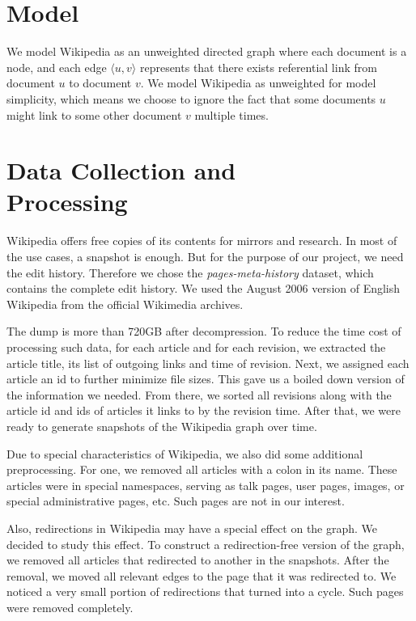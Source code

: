 \documentclass[10pt]{article}
\begin{document}
\begin{multicols}{2}
\section{Model}
We model Wikipedia as an unweighted directed graph where each document is a node, and each edge $\langle u, v \rangle$ represents that there exists referential link from document $u$ to document $v$. We model Wikipedia as unweighted for model simplicity, which means we choose to ignore the fact that some documents $u$ might link to some other document $v$ multiple times.


\section{Data Collection and\\ Processing}
Wikipedia offers free copies of its contents for mirrors and research. In most of the use cases, a snapshot is enough. But for the purpose of our project, we need the edit history. Therefore we chose the {\it pages-meta-history} dataset, which contains the complete edit history. We used the August 2006 version of English Wikipedia from the official Wikimedia archives.

The dump is more than 720GB after decompression. To reduce the time cost of processing such data, for each article and for each revision, we extracted the article title, its list of outgoing links and time of revision. Next, we assigned each article an id to further minimize file sizes. This gave us a boiled down version of the information we needed. From there, we sorted all revisions along with the article id and ids of articles it links to by the revision time. After that, we were ready to generate snapshots of the Wikipedia graph over time.

Due to special characteristics of Wikipedia, we also did some additional preprocessing. For one, we removed all articles with a colon in its name. These articles were in special namespaces, serving as talk pages, user pages, images, or special administrative pages, etc. Such pages are not in our interest.

Also, redirections in Wikipedia may have a special effect on the graph. We decided to study this effect. To construct a redirection-free version of the graph, we removed all articles that redirected to another in the snapshots. After the removal, we moved all relevant edges to the page that it was redirected to. We noticed a very small portion of redirections that turned into a cycle. Such pages were removed completely.


\end{multicols}
\end{document}
